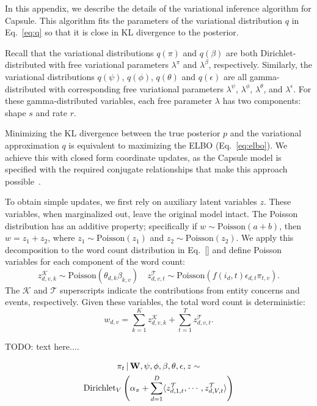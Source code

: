 
In this appendix, we describe the details of the variational inference algorithm for Capsule. This algorithm fits the parameters of the variational distribution $q$ in Eq.~\ref{eq:q} so that it is close in KL divergence to the posterior.

Recall that the variational distributions $q(\pi)$ and $q(\beta)$ are both Dirichlet-distributed with free variational parameters $\lambda^\pi$ and $\lambda^\beta$, respectively.  Similarly, the variational distributions $q(\psi)$, $q(\phi)$, $q(\theta)$ and $q(\epsilon)$ are all gamma-distributed with corresponding free variational parameters $\lambda^\psi$, $\lambda^\phi$, $\lambda^\theta$, and $\lambda^\epsilon$.  For these gamma-distributed variables, each free parameter $\lambda$ has two components: shape $s$ and rate $r$.

Minimizing the KL divergence between the true posterior $p$ and the variational approximation $q$ is equivalent to maximizing the ELBO (Eq.~\ref{eq:elbo}).  We achieve this with closed form coordinate updates, as the Capsule model is specified with the required conjugate relationships that make this approach possible~\cite{Ghahramani:2001}.

To obtain simple updates, we first rely on auxiliary latent variables $z$. These variables, when marginalized out, leave the original model intact. The Poisson distribution has an additive property; specifically if $w \sim \mbox{Poisson}(a+b)$, then $w = z_1 + z_2$, where $z_1 \sim \mbox{Poisson}(z_1)$ and $z_2 \sim \mbox{Poisson}(z_2)$.  We apply this decomposition to the word count distribution in Eq.~\ref{} and define Poisson variables for each component of the word count:
\begin{equation*}
  z^\mathcal{K}_{d,v,k} \sim \mbox{Poisson}(\theta_{d,k}\beta_{k,v}) \quad
  z^\mathcal{T}_{d,v,t} \sim \mbox{Poisson}\left(f(i_d, t) \epsilon_{d,t} \pi_{t,v}\right).
\end{equation*}
The $\mathcal{K}$ and $\mathcal{T}$ superscripts indicate the contributions from entity concerns and events, respectively.  Given these variables, the total word count is deterministic:
\[ w_{d,v} = \sum_{k=1}^K z^\mathcal{K}_{d,v,k} + \sum_{t=1}^T z^\mathcal{T}_{d,v,t}. \]

TODO: text here....

\begin{multline}
\pi_t \, | \, \mathbf{W}, \psi, \phi, \beta, \theta, \epsilon, z \sim \\
	\mbox{Dirichlet}_V\left(\alpha_\pi + \sum_{d=1}^D \langle
		z^\mathcal{T}_{d,1,t}, \cdots, z^\mathcal{T}_{d,V,t}\rangle
	\right)
\label{eq:pi}
\end{multline}

